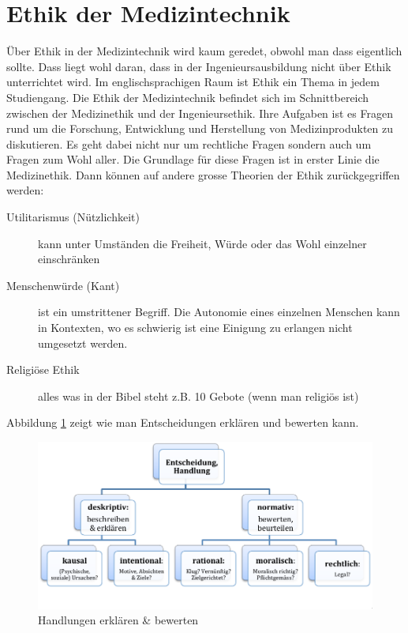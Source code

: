 \section{Ethik der Medizintechnik}

Über Ethik in der Medizintechnik wird kaum geredet, obwohl man dass eigentlich sollte. Dass liegt wohl daran, dass in der Ingenieursausbildung nicht über Ethik unterrichtet wird. Im englischsprachigen Raum ist Ethik ein Thema in jedem Studiengang. Die Ethik der Medizintechnik befindet sich im Schnittbereich zwischen der Medizinethik und der Ingenieursethik. Ihre Aufgaben ist es Fragen rund um die Forschung, Entwicklung und Herstellung von Medizinprodukten zu diskutieren. Es geht dabei nicht nur um rechtliche Fragen sondern auch um Fragen zum Wohl aller. Die Grundlage für diese Fragen ist in erster Linie die Medizinethik. Dann können auf andere grosse Theorien der Ethik zurückgegriffen werden:
\begin{description}
	\item[Utilitarismus (Nützlichkeit)] kann unter Umständen die Freiheit, Würde oder das Wohl einzelner einschränken
	\item[Menschenwürde (Kant)] ist ein umstrittener Begriff. Die Autonomie eines einzelnen Menschen kann in Kontexten, wo es schwierig ist eine Einigung zu erlangen nicht umgesetzt werden.
	\item[Religiöse Ethik] alles was in der Bibel steht z.B. 10 Gebote (wenn man religiös ist)
\end{description}
Abbildung \ref{fig:entscheidung} zeigt wie man Entscheidungen erklären und bewerten kann.

\begin{figure}
\centering
\includegraphics[width=0.7\linewidth]{fig/entscheidung}
\caption{Handlungen erklären \& bewerten}
\label{fig:entscheidung}
\end{figure}
